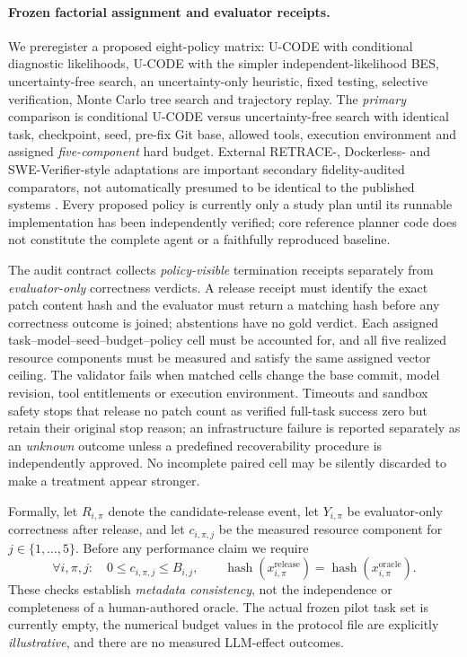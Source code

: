 \documentclass[pdflatex,sn-basic]{sn-jnl}
\begin{document}
\paragraph{Frozen factorial assignment and evaluator receipts.}
We preregister a proposed eight-policy matrix:
U-CODE with conditional diagnostic likelihoods,
U-CODE with the simpler independent-likelihood BES,
uncertainty-free search, an uncertainty-only heuristic,
fixed testing, selective verification,
Monte Carlo tree search and trajectory replay.
The \emph{primary} comparison is conditional U-CODE
versus uncertainty-free search with identical task,
checkpoint, seed, pre-fix Git base, allowed tools,
execution environment and assigned \emph{five-component}
hard budget. External RETRACE-, Dockerless- and
SWE-Verifier-style adaptations are important
secondary fidelity-audited comparators, not
automatically presumed to be identical to the
published systems \cite{li2026retrace,
zeng2026dockerless,zou2026sweverifier}.
Every proposed policy is currently only a study
plan until its runnable implementation has been
independently verified; core reference planner
code does not constitute the complete agent or
a faithfully reproduced baseline.

The audit contract collects \emph{policy-visible}
termination receipts separately from
\emph{evaluator-only} correctness verdicts.
A release receipt must identify the exact patch
content hash and the evaluator must return
a matching hash before any correctness outcome
is joined; abstentions have no gold verdict.
Each assigned task--model--seed--budget--policy
cell must be accounted for, and all five
realized resource components must be measured
and satisfy the same assigned vector ceiling.
The validator fails when matched cells change
the base commit, model revision, tool entitlements
or execution environment. Timeouts and sandbox safety stops that release
no patch count as verified full-task success
zero but retain their original stop reason;
an infrastructure failure is reported
separately as an \emph{unknown} outcome
unless a predefined recoverability
procedure is independently approved.
No incomplete paired cell may be silently
discarded to make a treatment appear stronger.

Formally, let $R_{i,\pi}$ denote the
candidate-release event, let $Y_{i,\pi}$
be evaluator-only correctness after release,
and let $c_{i,\pi,j}$ be the measured
resource component for $j\in\{1,\dots,5\}$.
Before any performance claim we require
\begin{equation}
 \forall i,\pi,j:\quad
 0\leq c_{i,\pi,j}\leq B_{i,j},
 \qquad
 \operatorname{hash}(x_{i,\pi}^{\mathrm{release}})
 =\operatorname{hash}(x_{i,\pi}^{\mathrm{oracle}}).
 \label{eq:receipt-integrity}
\end{equation}
These checks establish \emph{metadata consistency},
not the independence or completeness of a
human-authored oracle. The actual frozen
pilot task set is currently empty, the
numerical budget values in the protocol
file are explicitly \emph{illustrative},
and there are no measured LLM-effect outcomes.
\end{document}
